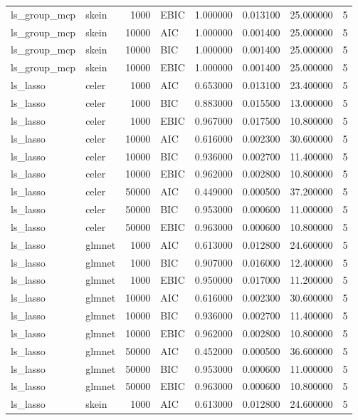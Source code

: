 \begin{table}[t]
\begin{tabular}{llrlrrrr}
ls_group_mcp & skein & 1000 & EBIC & 1.000000 & 0.013100 & 25.000000 & 5 \\
ls_group_mcp & skein & 10000 & AIC & 1.000000 & 0.001400 & 25.000000 & 5 \\
ls_group_mcp & skein & 10000 & BIC & 1.000000 & 0.001400 & 25.000000 & 5 \\
ls_group_mcp & skein & 10000 & EBIC & 1.000000 & 0.001400 & 25.000000 & 5 \\
ls_lasso & celer & 1000 & AIC & 0.653000 & 0.013100 & 23.400000 & 5 \\
ls_lasso & celer & 1000 & BIC & 0.883000 & 0.015500 & 13.000000 & 5 \\
ls_lasso & celer & 1000 & EBIC & 0.967000 & 0.017500 & 10.800000 & 5 \\
ls_lasso & celer & 10000 & AIC & 0.616000 & 0.002300 & 30.600000 & 5 \\
ls_lasso & celer & 10000 & BIC & 0.936000 & 0.002700 & 11.400000 & 5 \\
ls_lasso & celer & 10000 & EBIC & 0.962000 & 0.002800 & 10.800000 & 5 \\
ls_lasso & celer & 50000 & AIC & 0.449000 & 0.000500 & 37.200000 & 5 \\
ls_lasso & celer & 50000 & BIC & 0.953000 & 0.000600 & 11.000000 & 5 \\
ls_lasso & celer & 50000 & EBIC & 0.963000 & 0.000600 & 10.800000 & 5 \\
ls_lasso & glmnet & 1000 & AIC & 0.613000 & 0.012800 & 24.600000 & 5 \\
ls_lasso & glmnet & 1000 & BIC & 0.907000 & 0.016000 & 12.400000 & 5 \\
ls_lasso & glmnet & 1000 & EBIC & 0.950000 & 0.017000 & 11.200000 & 5 \\
ls_lasso & glmnet & 10000 & AIC & 0.616000 & 0.002300 & 30.600000 & 5 \\
ls_lasso & glmnet & 10000 & BIC & 0.936000 & 0.002700 & 11.400000 & 5 \\
ls_lasso & glmnet & 10000 & EBIC & 0.962000 & 0.002800 & 10.800000 & 5 \\
ls_lasso & glmnet & 50000 & AIC & 0.452000 & 0.000500 & 36.600000 & 5 \\
ls_lasso & glmnet & 50000 & BIC & 0.953000 & 0.000600 & 11.000000 & 5 \\
ls_lasso & glmnet & 50000 & EBIC & 0.963000 & 0.000600 & 10.800000 & 5 \\
ls_lasso & skein & 1000 & AIC & 0.613000 & 0.012800 & 24.600000 & 5 \\

\end{tabular}
\end{table}
